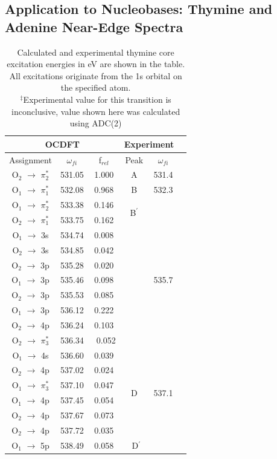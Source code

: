 \documentclass[11.5pt]{article}
\begin{document}
\subsection{Application to Nucleobases: Thymine and Adenine Near-Edge Spectra}

\begin{table}
\centering
    \begin{tabular}{c@{\hskip 0.22in}c@{\hskip 0.22in}c@{\hskip 0.52in}c@{\hskip 0.22in}c@{\hskip 0.22in}c}
    \hline
    \hline
  \multicolumn{3}{c}{OCDFT} &\multicolumn{2}{c}{Experiment} \\
  \hline
  Assignment & $\omega_{fi}$ & f$_{rel}$ & Peak &  $\omega_{fi}$   \\
  \hline
   O$_2$ $\rightarrow$ $\pi_2^*$ & 531.05 & 1.000 &  A & 531.4
   \vspace{2mm}\\
   O$_1$ $\rightarrow$ $\pi_1^*$ & 532.08 & 0.968 &  B & 532.3 
   \vspace{2mm}\\
   O$_1$ $\rightarrow$ $\pi_2^*$ & 533.38 & 0.146 & \multirow{2}{*}{ B$^{\prime}$} \\
   O$_2$ $\rightarrow$ $\pi_1^*$ & 533.75 & 0.162 &  \multirow{9}{*}{C} & \multirow{9}{*}{535.7}
   \vspace{2mm}\\
   O$_1$ $\rightarrow$ 3s & 534.74 & 0.008 \\
   O$_2$ $\rightarrow$ 3s & 534.85 & 0.042 \\
   O$_2$ $\rightarrow$ 3p & 535.28 & 0.020\\
   O$_1$ $\rightarrow$ 3p & 535.46 & 0.098\\
   O$_2$ $\rightarrow$ 3p & 535.53 & 0.085\\
   O$_1$ $\rightarrow$ 3p & 536.12 & 0.222\\
   O$_2$ $\rightarrow$ 4p & 536.24 & 0.103\\
   O$_2$ $\rightarrow$ $\pi_3^*$ & 536.34 & \ 0.052
   \vspace{2mm}\\
   O$_1$ $\rightarrow$ 4s & 536.60 & 0.039 & \multirow{6}{*}{D} & \multirow{6}{*}{537.1}\\
   O$_2$ $\rightarrow$ 4p & 537.02 & 0.024\\
   O$_1$ $\rightarrow$ $\pi_3^*$ & 537.10 & 0.047\\
   O$_1$ $\rightarrow$ 4p & 537.45 & 0.054\\
   O$_2$ $\rightarrow$ 4p & 537.67 & 0.073\\
   O$_2$ $\rightarrow$ 4p & 537.72 & 0.035
   \vspace{2mm}\\
   O$_1$ $\rightarrow$ 5p & 538.49 & 0.058 & \ D$^{\prime}$\\
   \hline
  \end{tabular}
      \caption{Calculated and experimental thymine core excitation energies in eV are shown in the table. All excitations originate from the 1s orbital on the specified atom. \\
  $^{\ddagger}$Experimental value for this transition is inconclusive, value shown here was calculated using ADC(2)}
  \label{figure:MOs}
  \end{table}
\end{document}
